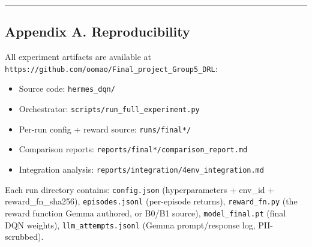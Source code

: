 \begin{center}\rule{0.5\linewidth}{0.5pt}\end{center}

\subsection{Appendix A. Reproducibility}\label{appendix-a-reproducibility}

All experiment artifacts are available at \texttt{https://github.com/oomao/Final\_project\_Group5\_DRL}:

\begin{itemize}
\tightlist
\item
  Source code: \texttt{hermes\_dqn/}
\item
  Orchestrator: \texttt{scripts/run\_full\_experiment.py}
\item
  Per-run config + reward source: \texttt{runs/final*/}
\item
  Comparison reports: \texttt{reports/final*/comparison\_report.md}
\item
  Integration analysis: \texttt{reports/integration/4env\_integration.md}
\end{itemize}

Each run directory contains: \texttt{config.json} (hyperparameters + env\_id + reward\_fn\_sha256), \texttt{episodes.jsonl} (per-episode returns), \texttt{reward\_fn.py} (the reward function Gemma authored, or B0/B1 source), \texttt{model\_final.pt} (final DQN weights), \texttt{llm\_attempts.jsonl} (Gemma prompt/response log, PII-scrubbed).

